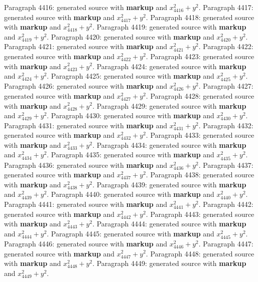 \documentclass{article}
\begin{document}
Paragraph 4416: generated source with \textbf{markup} and $x_{4416}^2 + y^2$.
Paragraph 4417: generated source with \textbf{markup} and $x_{4417}^2 + y^2$.
Paragraph 4418: generated source with \textbf{markup} and $x_{4418}^2 + y^2$.
Paragraph 4419: generated source with \textbf{markup} and $x_{4419}^2 + y^2$.
Paragraph 4420: generated source with \textbf{markup} and $x_{4420}^2 + y^2$.
Paragraph 4421: generated source with \textbf{markup} and $x_{4421}^2 + y^2$.
Paragraph 4422: generated source with \textbf{markup} and $x_{4422}^2 + y^2$.
Paragraph 4423: generated source with \textbf{markup} and $x_{4423}^2 + y^2$.
Paragraph 4424: generated source with \textbf{markup} and $x_{4424}^2 + y^2$.
Paragraph 4425: generated source with \textbf{markup} and $x_{4425}^2 + y^2$.
Paragraph 4426: generated source with \textbf{markup} and $x_{4426}^2 + y^2$.
Paragraph 4427: generated source with \textbf{markup} and $x_{4427}^2 + y^2$.
Paragraph 4428: generated source with \textbf{markup} and $x_{4428}^2 + y^2$.
Paragraph 4429: generated source with \textbf{markup} and $x_{4429}^2 + y^2$.
Paragraph 4430: generated source with \textbf{markup} and $x_{4430}^2 + y^2$.
Paragraph 4431: generated source with \textbf{markup} and $x_{4431}^2 + y^2$.
Paragraph 4432: generated source with \textbf{markup} and $x_{4432}^2 + y^2$.
Paragraph 4433: generated source with \textbf{markup} and $x_{4433}^2 + y^2$.
Paragraph 4434: generated source with \textbf{markup} and $x_{4434}^2 + y^2$.
Paragraph 4435: generated source with \textbf{markup} and $x_{4435}^2 + y^2$.
Paragraph 4436: generated source with \textbf{markup} and $x_{4436}^2 + y^2$.
Paragraph 4437: generated source with \textbf{markup} and $x_{4437}^2 + y^2$.
Paragraph 4438: generated source with \textbf{markup} and $x_{4438}^2 + y^2$.
Paragraph 4439: generated source with \textbf{markup} and $x_{4439}^2 + y^2$.
Paragraph 4440: generated source with \textbf{markup} and $x_{4440}^2 + y^2$.
Paragraph 4441: generated source with \textbf{markup} and $x_{4441}^2 + y^2$.
Paragraph 4442: generated source with \textbf{markup} and $x_{4442}^2 + y^2$.
Paragraph 4443: generated source with \textbf{markup} and $x_{4443}^2 + y^2$.
Paragraph 4444: generated source with \textbf{markup} and $x_{4444}^2 + y^2$.
Paragraph 4445: generated source with \textbf{markup} and $x_{4445}^2 + y^2$.
Paragraph 4446: generated source with \textbf{markup} and $x_{4446}^2 + y^2$.
Paragraph 4447: generated source with \textbf{markup} and $x_{4447}^2 + y^2$.
Paragraph 4448: generated source with \textbf{markup} and $x_{4448}^2 + y^2$.
Paragraph 4449: generated source with \textbf{markup} and $x_{4449}^2 + y^2$.
\end{document}
